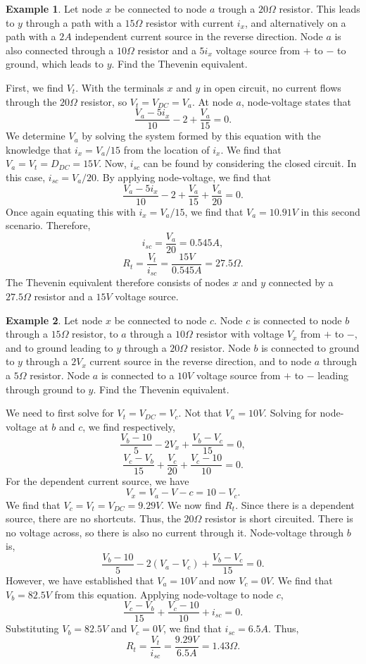 \documentclass[11pt]{article}
\theoremstyle{plain} %
\theoremstyle{definition}
\theoremstyle{example}
\newtheorem*{example}{Example}
\theoremstyle{remark}
\begin{document}
\begin{example}
Let node $x$ be connected to node $a$ trough a $20\Omega$ resistor. This leads to $y$ through a path with a $15\Omega$ resistor with current $i_x$, and alternatively on a path with a $2A$ independent current source in the reverse direction. Node $a$ is also connected through a  $10\Omega$ resistor and a $5i_x$ voltage source from $+$ to $-$ to ground, which leads to $y$. Find the Thevenin equivalent. 
\end{example}

First, we find $V_t$. With the terminals $x$ and $y$ in open circuit, no current flows through the $20\Omega$ resistor, so $V_t = V_{DC} = V_a$. At node $a$, node-voltage states that 
$$\frac{V_a-5i_x}{10} - 2 + \frac{V_a}{15} = 0.$$ We determine $V_a$ by solving the system formed by this equation with the knowledge that $i_x = V_a/15$ from the location of $i_x$. We find that $V_a = V_t = D_{DC} = 15V$. Now, $i_{sc}$ can be found by considering the closed circuit. In this case, $i_{sc} = V_a/20$. By applying node-voltage, we find that 
$$\frac{V_a-5i_x}{10} - 2 + \frac{V_a}{15} +\frac{V_a}{20}= 0.$$
Once again equating this with $i_x=V_a/15$, we find that $V_a = 10.91V$ in this second scenario. Therefore, 
$$i_{sc} = \frac{V_a}{20} = 0.545A,$$
$$R_t = \frac{V_t}{i_{sc}} = \frac{15V}{0.545A} = 27.5\Omega.$$
The Thevenin equivalent therefore consists of nodes $x$ and $y$ connected by a $27.5\Omega$ resistor and a $15V$ voltage source. 

\begin{example}
Let node $x$ be connected to node $c$. Node $c$ is connected to node $b$ through a  $15\Omega$ resistor, to $a$ through a $10\Omega$ resistor with voltage $V_x$ from $+$ to $-$, and to ground leading to $y$ through a $20\Omega$ resistor. Node $b$ is connected to ground to $y$ through a $2V_x$ current source in the reverse direction, and to node $a$ through a $5\Omega$ resistor. Node $a$ is connected to a $10V$ voltage source from $+$ to $-$ leading through ground to $y$. Find the Thevenin equivalent.
\end{example}

We need to first solve for $V_t = V_{DC} = V_c$. Not that $V_a = 10V$. Solving for node-voltage at $b$ and $c$, we find respectively,
$$\frac{V_b-10}{5} -2V_x+\frac{V_b-V_c}{15} = 0,$$
$$\frac{V_c-V_b}{15} + \frac{V_c}{20} + \frac{V_c-10}{10} = 0.$$
For the dependent current source, we have 
$$V_x = V_a-V-c = 10-V_c.$$
We find that $V_c = V_t = V_{DC} = 9.29V$. We now find $R_t$. Since there is a dependent source, there are no shortcuts. Thus, the $20\Omega$ resistor is short circuited. There is no voltage across, so there is also no current through it. Node-voltage through $b$ is,
$$\frac{V_b-10}{5} -2(V_a-V_c)+\frac{V_b-V_c}{15} = 0.$$
However, we have established that $V_a = 10V$ and now $V_c = 0V$. We find that $V_b = 82.5V$ from this equation. Applying node-voltage to node $c$, 
$$\frac{V_c-V_b}{15}  + \frac{V_c-10}{10} +i_{sc}= 0.$$ Substituting $V_b = 82.5V$ and $V_c = 0V$, we find that $i_{sc} = 6.5A$. Thus, 
$$R_t = \frac{V_t}{i_{sc}} = \frac{9.29V}{6.5A} = 1.43\Omega.$$
\end{document}
